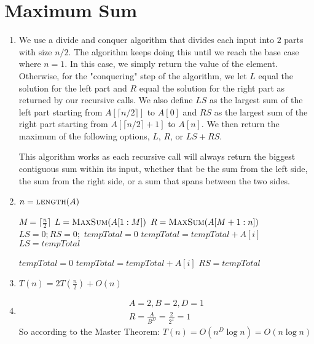 \documentclass{article}
\begin{document}
\section{Maximum Sum}
\begin{enumerate}
    \item We use a divide and conquer algorithm that divides each input into $2$ parts with size $n/2$.
            The algorithm keeps doing this until we reach the base case where $n=1$. In this case, we simply return the value of the element.
            Otherwise, for the "conquering" step of the algorithm, we let $L$ equal the solution for the left part and $R$ equal the solution for the right part as returned by our recursive calls.
            We also define $LS$ as the largest sum of the left part starting from $A[\lceil n/2\rceil]$ to $A[0]$ and
            $RS$ as the largest sum of the right part starting from $A[\lceil n/2\rceil + 1]$ to $A[n]$.
            We then return the maximum of the following options, $L$, $R$, or $LS + RS$.

            This algorithm works as each recursive call will always return the biggest contiguous sum within its input, whether that be the sum from the left side, the sum from the right side,
            or a sum that spans between the two sides.

    \item 
        \begin{algorithmic}
                \State $n = \Call{length}{A}$

                \EndIf
                \State $M = \lceil \frac{n}{2} \rceil$
                \State $L = \Call{MaxSum}{A[1 : M]}$
                \State $R = \Call{MaxSum}{A[M+1 : n]}$
                \State $LS = 0; RS = 0;$
                \State $tempTotal = 0$
                    \State $tempTotal = tempTotal + A[i]$
                        \State $LS = tempTotal$
                    \EndIf
                \EndFor

                \State $tempTotal = 0$
                \State $tempTotal = tempTotal + A[i]$
                    \State $RS = tempTotal$
                \EndIf
            \EndFor

            \EndFunction
        \end{algorithmic}
    \item $T(n) = 2T(\frac{n}{2}) + O(n)$
    \item 
        \begin{align*}
            A = 2, B = 2, D = 1 \\
            R = \frac{A}{B^D} = \frac{2}{2^1} = 1
        \end{align*}
        So according to the Master Theorem: $T(n) = O(n^D\log n) = O(n\log n)$
\end{enumerate}
\end{document}
